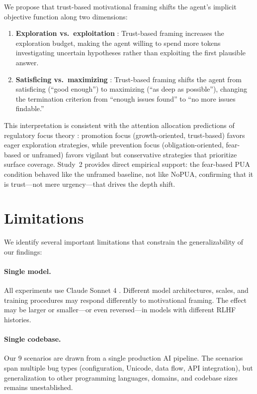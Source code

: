 \documentclass[11pt]{article}
\begin{document}
We propose that trust-based motivational framing shifts the agent's implicit objective function along two dimensions:

\begin{enumerate}
\item \textbf{Exploration vs.\ exploitation} \cite{march1991exploration}: Trust-based framing increases the exploration budget, making the agent willing to spend more tokens investigating uncertain hypotheses rather than exploiting the first plausible answer.

\item \textbf{Satisficing vs.\ maximizing} \cite{simon1956rational}: Trust-based framing shifts the agent from satisficing (``good enough'') to maximizing (``as deep as possible''), changing the termination criterion from ``enough issues found'' to ``no more issues findable.''
\end{enumerate}

This interpretation is consistent with the attention allocation predictions of regulatory focus theory \cite{higgins1997beyond}: promotion focus (growth-oriented, trust-based) favors eager exploration strategies, while prevention focus (obligation-oriented, fear-based or unframed) favors vigilant but conservative strategies that prioritize surface coverage. Study~2 provides direct empirical support: the fear-based PUA condition behaved like the unframed baseline, not like NoPUA, confirming that it is trust---not mere urgency---that drives the depth shift.

\section{Limitations}

We identify several important limitations that constrain the generalizability of our findings:

\paragraph{Single model.} All experiments use Claude Sonnet 4 \cite{claudesonnet4}. Different model architectures, scales, and training procedures may respond differently to motivational framing. The effect may be larger or smaller---or even reversed---in models with different RLHF histories.

\paragraph{Single codebase.} Our 9 scenarios are drawn from a single production AI pipeline. The scenarios span multiple bug types (configuration, Unicode, data flow, API integration), but generalization to other programming languages, domains, and codebase sizes remains unestablished.
\end{document}
